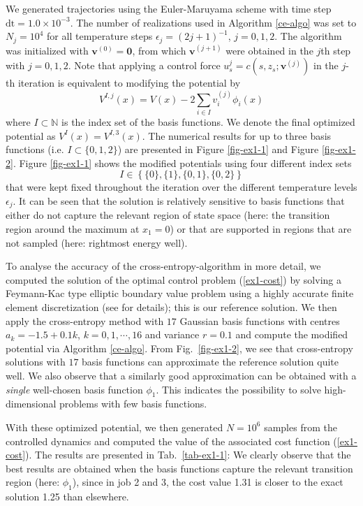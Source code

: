 \documentclass[final]{siamltex}
\newcommand{\N}{{\mathbb N}}
\newcommand{\eps}{\epsilon}
\begin{document}
We generated trajectories using the Euler-Maruyama scheme with time step $\mbox{dt} = 1.0 \times 10^{-3}$. The number of realizations used in Algorithm \ref{ce-algo} was set to $N_j = 10^{4}$ for all temperature steps $\eps_{j}=(2j+1)^{-1}$, $j=0,1,2$. The algorithm was initialized with $\bm{v}^{(0)} = \bm{0}$, from which $\bm{v}^{(j+1)}$ were obtained in the $j$th step with $j=0,1,2$. Note that applying a control force $u^{j}_{s}=c(s,z_{s};\bm{v}^{(j)})$ in the $j$-th iteration is equivalent to modifying the potential by  
\begin{equation}
V^{I,j}(x) = V(x) - 2\sum_{i\in I} v^{(j)}_i \phi_i(x)
\end{equation} 
where $I\subset \N$ is the index set of the basis functions. We denote the
final optimized potential as $V^I(x)=V^{I,3}(x)$. 
%
The numerical results for up to three basis functions (i.e. $I\subset\{0,1,2\}$) are presented in Figure \ref{fig-ex1-1} and 
Figure \ref{fig-ex1-2}. Figure \ref{fig-ex1-1} shows the modified potentials using four different index sets 
\begin{equation}
I\in\left\{\{0\},\{1\},\{0,1\},\{0,2\}\right\} 
\end{equation}
that were kept fixed throughout the iteration over the different temperature levels $\eps_{j}$. It can be seen that the solution is relatively sensitive to basis functions that either do not capture the relevant region of state space (here: the transition region around the maximum at $x_{1}=0$) or that are supported in regions that are not sampled (here: rightmost energy well). 


To analyse the accuracy of the cross-entropy-algorithm in more detail, we computed the solution of the optimal control problem (\ref{ex1-cost}) 
by solving a Feymann-Kac type elliptic boundary value problem using a highly accurate finite element discretization (see
\cite{control_schuette} for details); this is our reference solution. We then apply the cross-entropy method with $17$ Gaussian basis functions
with centres  $a_k = -1.5 + 0.1k$, $k=0,1,\cdots, 16$ and variance $r=0.1$ and compute the modified potential via Algorithm \ref{ce-algo}.
From Fig.~\ref{fig-ex1-2}, we see that cross-entropy
solutions with $17$ basis functions can approximate the reference solution quite well.
We also observe that a similarly good approximation can be obtained with a \emph{single} well-chosen
basis function $\phi_1$. This indicates the possibility to solve high-dimensional problems with few basis functions.

With these optimized potential, we then generated $N = 10^{6}$ samples from the
controlled dynamics and computed the value of the associated cost function (\ref{ex1-cost}). The results are presented in
Tab.~\ref{tab-ex1-1}: We clearly observe that the best results are obtained when the basis functions capture the relevant transition region (here: 
$\phi_1$), since in job 2 and 3, the cost value 1.31 is closer to the exact
solution 1.25 than elsewhere. 
\end{document}
